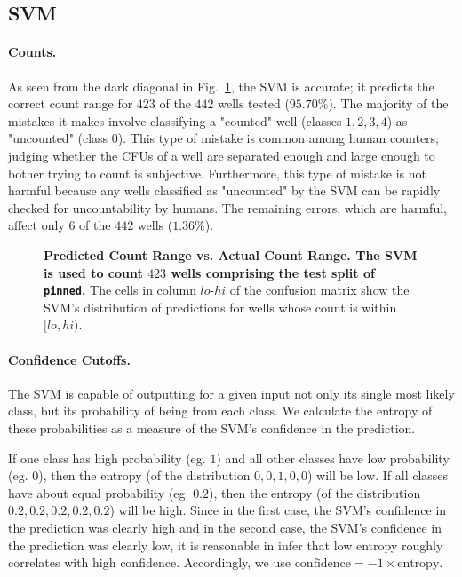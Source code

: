 \documentclass[10pt,letterpaper]{article}
\begin{document}
    \subsection*{SVM} \label{ssec:svm_results}
        \paragraph*{Counts.}
            As seen from the dark diagonal in Fig.~\ref{svm_counts}, the SVM is accurate; it predicts the correct count range for $423$ of the $442$ wells tested ($95.70\%$). The majority of the mistakes it makes involve classifying a "counted" well (classes $1, 2, 3, 4$) as "uncounted" (class $0$). This type of mistake is common among human counters; judging whether the CFUs of a well are separated enough and large enough to bother trying to count is subjective. Furthermore, this type of mistake is not harmful because any wells classified as "uncounted" by the SVM can be rapidly checked for uncountability by humans. The remaining errors, which are harmful, affect only $6$ of the $442$ wells ($1.36\%$).
                        
            \begin{figure}[h]
                
                \caption{{\bf Predicted Count Range vs. Actual Count Range. The SVM is used to count $423$ wells comprising the test split of \texttt{pinned}.} The cells in column $lo$-$hi$ of the confusion matrix show the SVM's distribution of predictions for wells whose count is within $[lo, hi)$.}
                \label{svm_counts}
            \end{figure}
        
        \paragraph*{Confidence Cutoffs.}            
            The SVM is capable of outputting for a given input not only its single most likely class, but its probability of being from each class. We calculate the entropy of these probabilities as a measure of the SVM's confidence in the prediction.
            
            If one class has high probability (eg. $1$) and all other classes have low probability (eg. $0$), then the entropy (of the distribution $0, 0, 1, 0, 0$) will be low. If all classes have about equal probability (eg. $0.2$), then the entropy (of the distribution $0.2, 0.2, 0.2, 0.2, 0.2$) will be high. Since in the first case, the SVM's confidence in the prediction was clearly high and in the second case, the SVM's confidence in the prediction was clearly low, it is reasonable in infer that low entropy roughly correlates with high confidence. Accordingly, we use $\text{confidence} = -1 \times \text{entropy}$.
            
\end{document}
